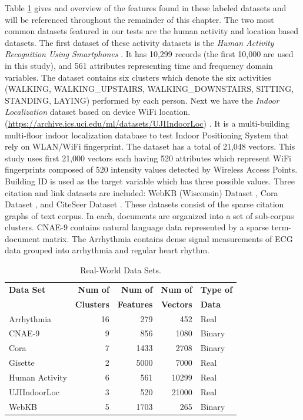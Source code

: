Table \ref{realworld} gives and overview of the features found in these labeled datasets and will be
referenced throughout the remainder of this chapter. The two most common datasets featured in our
tests are the human activity and location based datasets.  The first dataset of these activity
datasets is the \emph{Human Activity Recognition Using Smartphones} \cite{har}.  It has 10,299
records (the first 10,000 are used in this study), and 561 attributes representing time and
frequency domain variables.  The dataset contains six clusters which denote the six activities
(WALKING, WALKING\_UPSTAIRS, WALKING\_DOWNSTAIRS, SITTING, STANDING, LAYING) performed by each
person. Next we have the \emph{Indoor Localization} dataset based on device WiFi location.
(\url{https://archive.ics.uci.edu/ml/datasets/UJIIndoorLoc}) \cite{UJII}.  It is a multi-building
multi-floor indoor localization database to test Indoor Positioning System that rely on WLAN/WiFi
fingerprint.  The dataset has a total of 21,048 vectors.  This study uses first 21,000 vectors each
having 520 attributes which represent WiFi fingerprints composed of 520 intensity values detected by
Wireless Access Points.  Building ID is used as the target variable which has three possible values.
Three citation and link datasets are included: WebKB (Wisconsin) Dataset \cite{sen-08}, Cora Dataset
\cite{sen-08}, and CiteSeer Dataset \cite{sen-08}.  These datasets consist of the sparse citation
graphs of text corpus.  In each, documents are organized into a set of sub-corpus clusters.
CNAE-9 \cite{cnae} contains natural language data represented by a sparse term-document matrix.  The
Arrhythmia \cite{guvenir-xx} contains dense signal measurements of ECG data grouped into arrhythmia
and regular heart rhythm.

\begin{table}
\centering
\begin{tabular}{|l|r|r|r|l|}
\hline
\rowcolor[HTML]{FFCE93} 
\textbf{Data Set} & \textbf{Num of}   & \textbf{Num of}   & \textbf{Num of} & \textbf{Type of} \\
\rowcolor[HTML]{FFCE93}
                  & \textbf{Clusters} & \textbf{Features} & \textbf{Vectors} & \textbf{Data} \\ \hline
Arrhythmia \cite{guvenir-xx}     & 16 &  279 &   452 & Real   \\
CNAE-9 \cite{ciarelli-xx}        &  9 &  856 &  1080 & Binary \\
Cora \cite{sen-08}               &  7 & 1433 &  2708 & Binary \\
Gisette \cite{guyon-04}          &  2 & 5000 &  7000 & Real   \\
Human Activity \cite{anguita-13} &  6 &  561 & 10299 & Real   \\
UJIIndoorLoc \cite{sospedra-14}  &  3 &  520 & 21000 & Real   \\
WebKB \cite{sen-08}              &  5 & 1703 &   265 & Binary \\ \hline
\end{tabular}
\caption{Real-World Data Sets.}\label{realworld}
\end{table}

